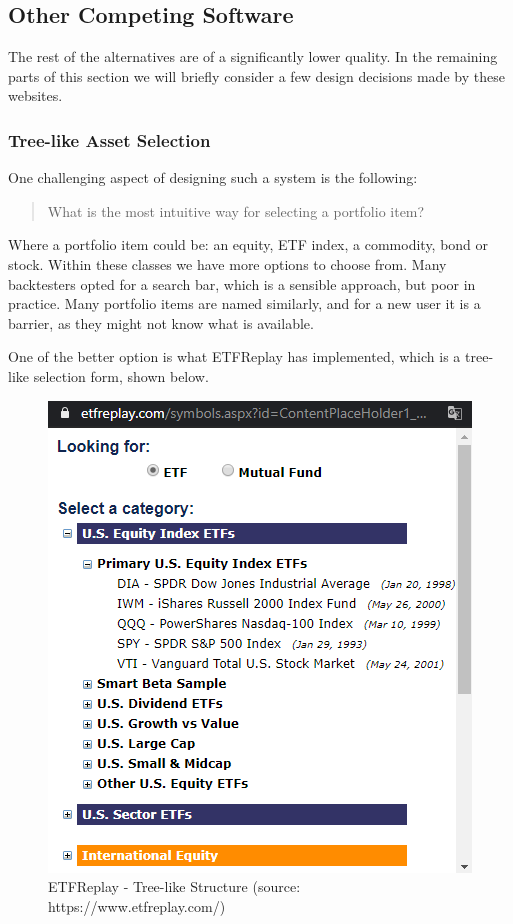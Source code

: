 \documentclass[main.tex]{subfiles}
\begin{document}
\subsection{Other Competing Software}

The rest of the alternatives are of a significantly lower quality. In the remaining parts of this section we will briefly consider a few design decisions made by these websites.

\subsubsection*{Tree-like Asset Selection}

One challenging aspect of designing such a system is the following: 

\begin{quote}
    What is the most intuitive way for selecting a portfolio item? 
\end{quote}

Where a portfolio item could be: an equity, ETF index, a commodity, bond or stock. Within these classes we have more options to choose from. Many backtesters opted for a search bar, which is a sensible approach, but poor in practice. Many portfolio items are named similarly, and for a new user it is a barrier, as they might not know what is available. 

One of the better option is what ETFReplay \cite{etfreplay} has implemented, which is a tree-like selection form, shown below. 

\begin{figure}[H]
   \centering
   \includegraphics[scale=0.7]{02Background/02Pictures/etfreplay.png}
   \caption{ETFReplay - Tree-like Structure (source: https://www.etfreplay.com/)}
\end{figure}
\end{document}

